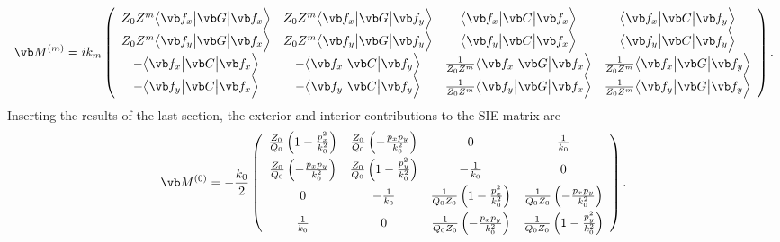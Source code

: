 \documentclass{article}
\newcommand{\vmv}[3]{ \big\langle #1 \big| #2 \big| #3 \Big\rangle}
\begin{document}
$$ \vb M^{(m)}=
   ik_m 
   \left(\begin{array}{cccc}
    Z_0 Z^m
    \vmv{ \vb f_{x} } { \vb G } { \vb f_x }
  & Z_0 Z^m
    \vmv{ \vb f_{x} } { \vb G } { \vb f_y }
  & \vmv{ \vb f_{x} } { \vb C } { \vb f_x }
  & \vmv{ \vb f_{x} } { \vb C } { \vb f_y }
 \\[3pt]
    Z_0 Z^m
    \vmv{ \vb f_{y} } { \vb G } { \vb f_x }
  & Z_0 Z^m
    \vmv{ \vb f_{y} } { \vb G } { \vb f_y }
  & \vmv{ \vb f_{y} } { \vb C } { \vb f_x }
  & \vmv{ \vb f_{y} } { \vb C } { \vb f_y }
 \\[3pt]
    -\vmv{ \vb f_{x} } { \vb C } { \vb f_x }
  & -\vmv{ \vb f_{x} } { \vb C } { \vb f_y }
  & \frac{1}{Z_0 Z^m} \vmv{ \vb f_{x} } { \vb G } { \vb f_x }
  & \frac{1}{Z_0 Z^m} \vmv{ \vb f_{x} } { \vb G } { \vb f_y }
 \\[3pt]
    -\vmv{ \vb f_{y} } { \vb C } { \vb f_x }
  & -\vmv{ \vb f_{y} } { \vb C } { \vb f_y }
  & \frac{1}{Z_0 Z^m} \vmv{ \vb f_{y} } { \vb G } { \vb f_x }
  & \frac{1}{Z_0 Z^m} \vmv{ \vb f_{y} } { \vb G } { \vb f_y }
   \end{array}\right).
$$
Inserting the results of the last section, the exterior and interior
contributions to the SIE matrix are 
$$ \vb M^{(0)}=
   -\frac{k_0}{2}
   \left(\begin{array}{cccc}
    \frac{Z_0}{Q_0}\left(1-\frac{p_x^2}{k_0^2}\right)
  &
    \frac{Z_0}{Q_0}\left(-\frac{p_xp_y}{k_0^2}\right)
  & 0 
  & \frac{1}{k_0}
 \\[6pt]
    \frac{Z_0}{Q_0}\left(-\frac{p_x p_y}{k_0^2}\right)
  &
    \frac{Z_0}{Q_0}\left(1-\frac{p_y^2}{k_0^2}\right)
  & -\frac{1}{k_0}
  & 0 
 \\[6pt]
    0
  & -\frac{1}{k_0}
  & \frac{1}{Q_0 Z_0} \left(1-\frac{p_x^2}{k_0^2}\right)
  & \frac{1}{Q_0 Z_0} \left(-\frac{p_xp_y }{k_0^2}\right)
 \\[6pt]
    \frac{1}{k_0}
  & 0
  & \frac{1}{Q_0 Z_0} \left(-\frac{p_xp_y}{k_0^2}\right)
  & \frac{1}{Q_0 Z_0} \left(1-\frac{p_y^2}{k_0^2}\right)
   \end{array}\right).
$$
\end{document}
